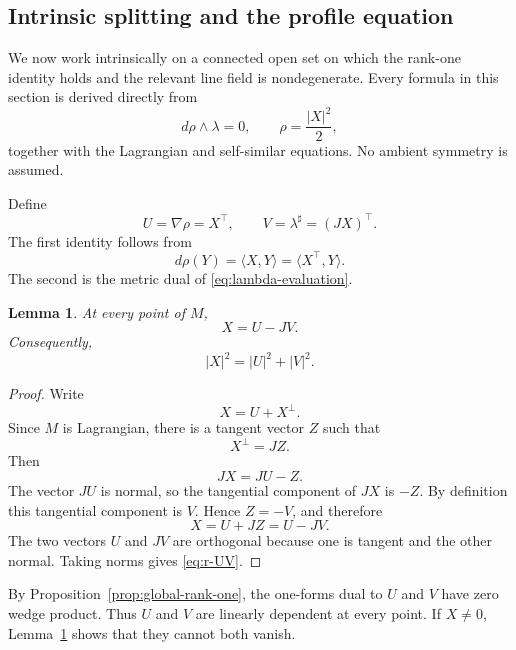 \documentclass[11pt,a4paper]{article}
\numberwithin{equation}{section}
\newtheorem{lemma}[theorem]{Lemma}
\begin{document}
\subsection{Intrinsic splitting and the profile equation}

We now work intrinsically on a connected open set on which the rank-one identity holds and the relevant line field is nondegenerate.  Every formula in this section is derived directly from
$$
        d\rho\wedge\lambda=0,
        \qquad
        \rho=\frac{|X|^2}{2},
$$
together with the Lagrangian and self-similar equations.  No ambient symmetry is assumed.


Define
\begin{equation*}
        U=\nabla\rho=X^\top,
        \qquad
        V=\lambda^\sharp=(JX)^\top.
\end{equation*}
The first identity follows from
$$
        d\rho(Y)=\langle X,Y\rangle
        =\langle X^\top,Y\rangle.
$$
The second is the metric dual of \eqref{eq:lambda-evaluation}.

\begin{lemma}\label{lem:X-U-V}
At every point of $M$,
\begin{equation*}
        X=U-JV.
\end{equation*}
Consequently,
\begin{equation}\label{eq:r-UV}
        |X|^2=|U|^2+|V|^2.
\end{equation}
\end{lemma}

\begin{proof}
Write
$$
        X=U+X^\perp.
$$
Since $M$ is Lagrangian, there is a tangent vector $Z$ such that
$$
        X^\perp=JZ.
$$
Then
$$
        JX=JU-Z.
$$
The vector $JU$ is normal, so the tangential component of $JX$ is $-Z$.  By definition this tangential component is $V$.  Hence $Z=-V$, and therefore
$$
        X=U+JZ=U-JV.
$$
The two vectors $U$ and $JV$ are orthogonal because one is tangent and the other normal.  Taking norms gives \eqref{eq:r-UV}.
\end{proof}

By Proposition~\ref{prop:global-rank-one}, the one-forms dual to $U$ and $V$ have zero wedge product.  Thus $U$ and $V$ are linearly dependent at every point.  If $X\ne0$, Lemma~\ref{lem:X-U-V} shows that they cannot both vanish.
\end{document}
